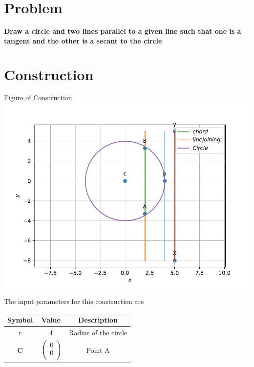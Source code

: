 \documentclass[10pt, a4paper]{article}
\begin{document}
\title{\mytitle}
\author{\myauthor\hspace{1em}\\\contact\\FWC22008\hspace{6.5em}IITH\hspace{0.5em}\mymodule\hspace{6em}ASSIGN-4}
\date{}
	\maketitle
		
	\tableofcontents
\vspace{5mm}
   \section{Problem}
\textbf{ Draw a circle and two lines parallel to a given line such that one is a tangent and the other is a secant to the circle }
 \section{Construction}
 	\begin{center}
     Figure of Construction
     \includegraphics[scale=0.5]{fig.pdf} 
  	\end{center}
  	The input parameters for this construction are 
\begin{center}
\begin{tabular}{|c|c|c|}
	\hline
	\textbf{Symbol}&\textbf{Value}&\textbf{Description}\\
	\hline
	r&4&Radius of the circle\\
	\hline
	\textbf{C}&$\
	\begin{pmatrix}
		0 \\
		0 \\
	\end{pmatrix}$
	&Point A\\
	\hline
	
\end{tabular}
\end{center}
\end{document}

